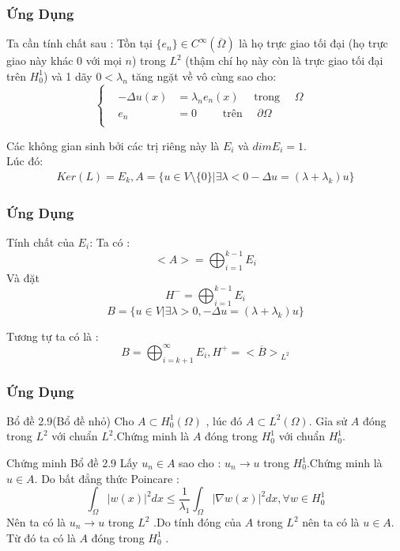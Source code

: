 \documentclass{beamer}
\begin{document}
\begin{frame}
\frametitle{Ứng Dụng}
\begin{block}{Ta cần tính chất sau :}
Tồn tại $\{e_n\}\in C^{\infty}(\overline{\Omega})$ là họ trực giao tối đại (họ trực giao này khác 0 với mọi $n$) trong $L^2$ (thậm chí họ này còn là trực giao tối đại trên $H_0^1$) và 1 dãy $0<\lambda_n$ tăng ngặt về vô cùng sao cho:
\[
\begin{cases}
\begin{array}{c}
\begin{aligned}
-\Delta u(x)&=\lambda_n e_n(x)\quad \text{ trong } \quad \Omega\\
 e_n&=0\qquad \text{ trên } \quad \partial\Omega
\end{aligned}
\end{array} 
\end{cases}
\]
\end{block}
\begin{block}
\noindent Các không gian sinh bởi các trị riêng này là $E_i$ và $dim E_i=1$.\\
Lúc đó:
\begin{align*}
Ker(L)=E_k,A=\{u\in V\setminus\{0\}|\exists \lambda<0-\Delta u=(\lambda+\lambda_k) u\}
\end{align*}
\end{block}
\end{frame}

\begin{frame}
\frametitle{Ứng Dụng}
\begin{block}{Tính chất của  $E_i$:}
Ta có :$$<A>=\bigoplus_{i=1}^{k-1}E_i$$
Và đặt $$H^{-}=\bigoplus_{i=1}^{k-1}E_i$$
$$B=\{u\in V|\exists \lambda>0 ,-\Delta u=(\lambda+\lambda_k) u\}$$
\end{block}
\begin{block}{Tương tự ta có là : }
$$
B=\bigoplus_{i=k+1}^{\infty}E_i,H^{+}=\overline{<B>}_{L^2}
$$
\end{block}
\end{frame}

\begin{frame}
\frametitle{Ứng Dụng}
\begin{block}{Bổ đề 2.9(Bổ đề nhỏ)} Cho $A\subset H^1_0{(\Omega)}$ , lúc đó $A\subset L^2(\Omega)$. Gỉa sử $A$ đóng trong $L^2$ với chuẩn $L^2$.Chứng minh là $A$ đóng trong $H^1_0$ với chuẩn $H^1_0$.
\end{block}
\begin{block}{Chứng minh Bổ đề 2.9}
Lấy $u_n\in A$ sao cho : $u_n\rightarrow u$ trong $H^1_0 $.Chứng minh là $u\in A$. 
Do bất đẳng thức Poincare : $$\int_{\Omega}|w(x)|^2dx\leq \frac{1}{\lambda_1}\int_{\Omega}|\nabla w(x)|^2dx,\forall w\in H^1_0$$
Nên ta có là $u_n\rightarrow u$ trong $L^2$ .Do tính đóng của $A$ trong $L^2$ nên ta có là $u\in A$. Từ đó ta có là $A$ đóng trong $H^1_0$ .
\end{block}
\end{frame}
\end{document}
